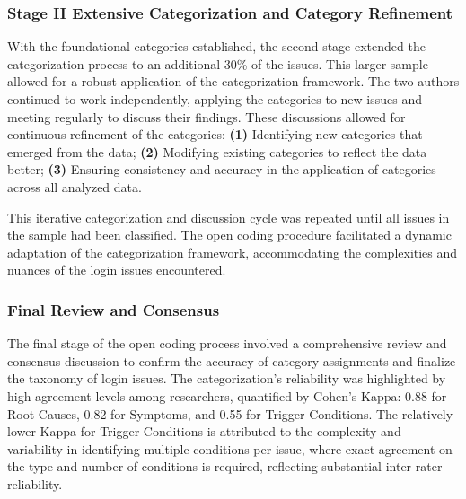 \subsubsection{Stage II Extensive Categorization and Category Refinement}

With the foundational categories established, the second stage extended the categorization process to an additional 30\% of the issues. This larger sample allowed for a robust application of the categorization framework. The two authors continued to work independently, applying the categories to new issues and meeting regularly to discuss their findings. These discussions allowed for continuous refinement of the categories: \textbf{(1)} Identifying new categories that emerged from the data; \textbf{(2)} Modifying existing categories to reflect the data better; \textbf{(3)} Ensuring consistency and accuracy in the application of categories across all analyzed data.

This iterative categorization and discussion cycle was repeated until all issues in the sample had been classified. The open coding procedure facilitated a dynamic adaptation of the categorization framework, accommodating the complexities and nuances of the login issues encountered.

\subsubsection{Final Review and Consensus}

The final stage of the open coding process involved a comprehensive review and consensus discussion to confirm the accuracy of category assignments and finalize the taxonomy of login issues. The categorization's reliability was highlighted by high agreement levels among researchers, quantified by Cohen’s Kappa: 0.88 for Root Causes, 0.82 for Symptoms, and 0.55 for Trigger Conditions. The relatively lower Kappa for Trigger Conditions is attributed to the complexity and variability in identifying multiple conditions per issue, where exact agreement on the type and number of conditions is required, reflecting substantial inter-rater reliability. 